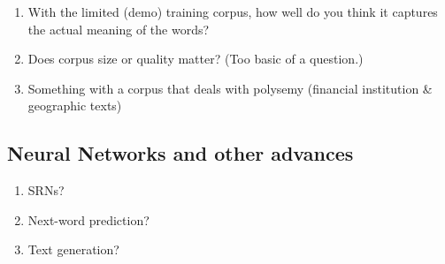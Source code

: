 \begin{enumerate}
\item With the limited (demo) training corpus, how well do you think it captures the actual meaning of the words?
\item Does corpus size or quality matter? (Too basic of a question.)
\item Something with a corpus that deals with polysemy (financial institution \& geographic texts)
\end{enumerate}

\subsection{Neural Networks and other advances}

\begin{enumerate}
\item SRNs?
\item Next-word prediction?
\item Text generation?
\end{enumerate}